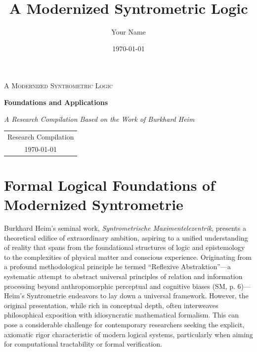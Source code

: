 \documentclass[
    12pt,              %
    a4paper,           %
    headings=normal,   %
    twoside=true,      %
    BCOR=8mm,          %
]{scrbook}
\title{\Huge\bfseries A Modernized Syntrometric Logic}
\author{\Large Your Name} %
\date{\today} %
\newcommand{\q}[1]{\enquote{#1}}
\begin{document}
\begin{titlepage}
    \centering
    \vfill %

    {\scshape\LARGE A Modernized Syntrometric Logic\par}
    \vspace{1cm}
    {\Huge\bfseries Foundations and Applications\par}
    \vspace{2cm}
    {\Large \textit{A Research Compilation Based on the Work of Burkhard Heim}}\par

    \vfill %

    {\large
    \begin{tabular}{c}
        Research Compilation \\
        \today
    \end{tabular}
    }
\end{titlepage}

\cleardoublepage %
\tableofcontents
\cleardoublepage %

\chapter*{Formal Logical Foundations of Modernized Syntrometrie}
\label{chap:formal_foundations}

Burkhard Heim’s seminal work, \textit{Syntrometrische Maximentelezentrik}, presents a theoretical edifice of extraordinary ambition, aspiring to a unified understanding of reality that spans from the foundational structures of logic and epistemology to the complexities of physical matter and conscious experience. Originating from a profound methodological principle he termed \q{Reflexive Abstraktion}---a systematic attempt to abstract universal principles of relation and information processing beyond anthropomorphic perceptual and cognitive biases (SM, p. 6)---Heim’s Syntrometrie endeavors to lay down a universal framework. However, the original presentation, while rich in conceptual depth, often interweaves philosophical exposition with idiosyncratic mathematical formalism. This can pose a considerable challenge for contemporary researchers seeking the explicit, axiomatic rigor characteristic of modern logical systems, particularly when aiming for computational tractability or formal verification.
\end{document}
